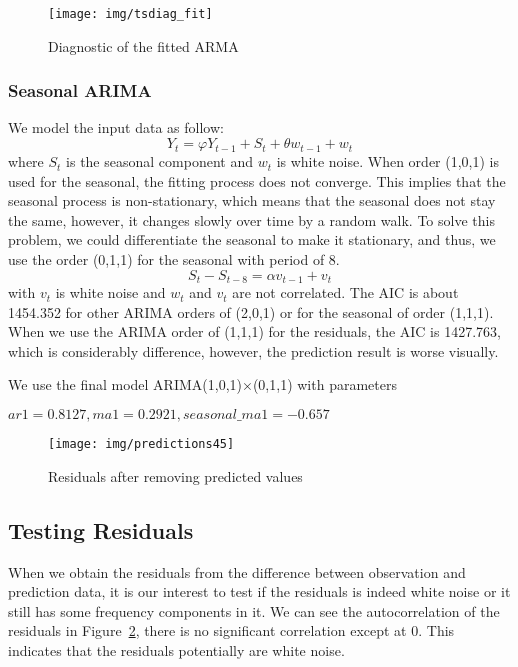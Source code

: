 \documentclass[12pt]{article}
\begin{document}
\begin{figure}[ht!]
\centering
\texttt{[image: img/tsdiag\_fit]}
\caption{Diagnostic of the fitted ARMA}\label{fig:tsdiag_fit}
\end{figure}

\subsubsection{Seasonal ARIMA}
We model the input data as follow:
\begin{equation}
Y_t = \varphi Y_{t-1}+S_t+ \theta w_{t-1}+w_t
\end{equation}
where $S_t$ is the seasonal component and $w_t$ is white noise. When order
(1,0,1) is used for the seasonal, the fitting process does not converge. This implies that the seasonal
process is non-stationary, which means that the seasonal does not
stay the same, however, it changes slowly over time by a random walk. To solve
this problem, we could differentiate the seasonal to make it stationary,
and thus, we use the order (0,1,1) for the seasonal with period of 8.
\begin{equation}
S_t - S_{t-8} = \alpha v_{t-1} + v_t
\end{equation}
with $v_t$ is white noise and $w_t$ and $v_t$ are not correlated. 
The AIC is about 1454.352 for other ARIMA orders of (2,0,1) or for the seasonal
of order (1,1,1). When we use the ARIMA order of (1,1,1) for the residuals, the
AIC is 1427.763, which is considerably difference, however, the prediction
result is worse visually. 

We use the final model ARIMA(1,0,1)$\times$(0,1,1) with parameters  

$ar1=0.8127,ma1=0.2921, seasonal\_ma1=-0.657$

\begin{figure}[ht!]
\centering
\texttt{[image: img/predictions45]}
\caption{Residuals after removing predicted values}\label{fig:predictions45}
\end{figure}

\subsection{Testing Residuals}
When we obtain the residuals from the difference between observation and
prediction data, it is our interest to test if the residuals is indeed white
noise or it still has some frequency components in it. We can see the
autocorrelation of the residuals in Figure~\ref{fig:predictions45}, there is no
significant correlation except at 0. This indicates that the residuals
potentially are white noise.
\end{document}
